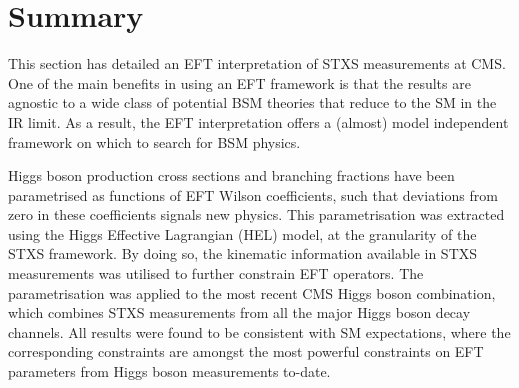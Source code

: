 

\section{Summary}
This section has detailed an EFT interpretation of STXS measurements at CMS. One of the main benefits in using an EFT framework is that the results are agnostic to a wide class of potential BSM theories that reduce to the SM in the IR limit. As a result, the EFT interpretation offers a (almost) model independent framework on which to search for BSM physics. 

Higgs boson production cross sections and branching fractions have been parametrised as functions of EFT Wilson coefficients, such that deviations from zero in these coefficients signals new physics. This parametrisation was extracted using the Higgs Effective Lagrangian (HEL) model, at the granularity of the STXS framework. By doing so, the kinematic information available in STXS measurements was utilised to further constrain EFT operators. The parametrisation was applied to the most recent CMS Higgs boson combination, which combines STXS measurements from all the major Higgs boson decay channels. All results were found to be consistent with SM expectations, where the corresponding constraints are amongst the most powerful constraints on EFT parameters from Higgs boson measurements to-date. 

